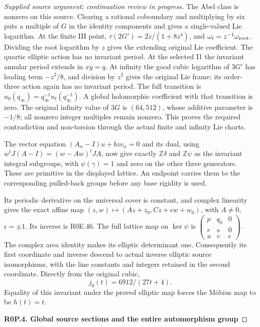 \begin{proof}[Supplied source argument; continuation review in progress]
The Abel class is nonzero on this source. Clearing a rational
coboundary and multiplying by six puts a multiple of \(G\) in
the identity components and gives a single-valued Lie logarithm.
At the finite III point, \(\tau(2G')=2z/(1+8z^4)\), and
\(\omega_t=z^{-1}\omega_{\rm root}\). Dividing the root
logarithm by \(z\) gives the extending original Lie coefficient.
The quartic elliptic action has no invariant period. At the
selected I1 the invariant annular period extends in \(xy=q\).
At infinity the good cubic logarithm of \(3G'\) has leading
term \(-z^2/8\), and division by \(z^2\) gives the original
Lie frame; its order-three action again has no invariant period.
The full transition is \(u_0(q_\infty)=q_\infty^{-1}u_t(q_\infty^{-1})\).
A global holomorphic coefficient with that transition is zero.
The original infinity value of \(3G\) is \((64,512)\), whose
additive parameter is \(-1/8\); all nonzero integer multiples
remain nonzero. This proves the required contradiction and
non-torsion through the actual finite and infinity Lie charts.

The vector equation \((A_\alpha-I)u+bzv_\alpha=0\) and its
dual, using
\(w^tJ(A-I)=(w-Aw)^tJA\), now give exactly
\(\mathbb Z\delta\) and \(\mathbb Z\psi\) as the invariant
integral subgroups, with \(\psi(\gamma)=1\) and zero on the
other three generators. These are primitive in the displayed
lattice. An endpoint carries them to the corresponding pulled-back
groups before any base rigidity is used.

Its periodic derivative on the universal cover is constant, and
complex linearity gives the exact affine map
\((z,w)\mapsto(Az+z_0,Cz+\epsilon w+w_0)\), with
\(A\ne0\), \(\epsilon=\pm1\). Its inverse is R0E.46.
The full lattice map on \(\ker\psi\) is
\(\left(\begin{smallmatrix}p&q_0&0\\r&s&0\\u&v&\epsilon\end{smallmatrix}\right)\).
The complex area identity makes its elliptic determinant one.
Consequently its first coordinate and inverse descend to actual
inverse elliptic source isomorphisms, with the line constants and
integers retained in the second coordinate. Directly from the
original cubic,
\[
 j_0(t)=6912/(27t+4).
 \tag{R0P.14}
\]
Equality of this invariant under the proved elliptic map forces
the Möbius map to be \(h(t)=t\).

\par

\medskip\noindent\textbf{R0P.4. Global source sections and the entire automorphism group}


\end{proof}
